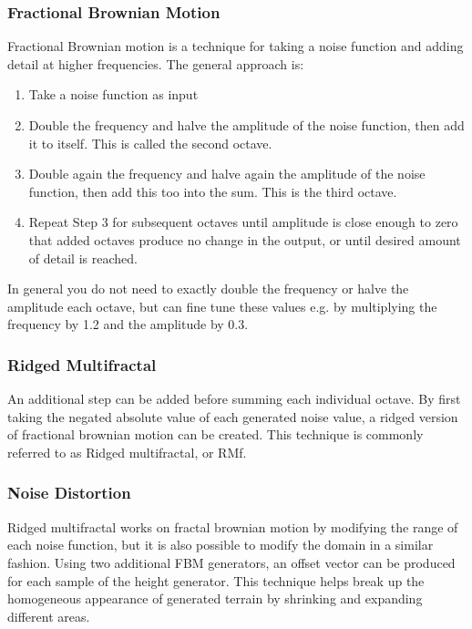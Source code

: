 
\subsubsection{Fractional Brownian Motion}

Fractional Brownian motion is a technique for taking a noise function and adding detail at higher frequencies.
The general approach is:
\begin{enumerate}
\item Take a noise function as input
\item Double the frequency and halve the amplitude of the noise function, then add it to itself. This is called the second octave.
\item Double again the frequency and halve again the amplitude of the noise function, then add this too into the sum. This is the third octave.
\item Repeat Step 3 for subsequent octaves until amplitude is close enough to zero that added octaves produce no change in the output, or until desired amount of detail is reached.
\end{enumerate}

In general you do not need to exactly double the frequency or halve the amplitude each octave, but can fine tune these values e.g. by multiplying the frequency by 1.2 and the amplitude by 0.3.

\subsubsection{Ridged Multifractal}

An additional step can be added before summing each individual octave.
By first taking the negated absolute value of each generated noise value, a ridged version of fractional brownian motion can be created.
This technique is commonly referred to as Ridged multifractal, or RMf.

\subsubsection{Noise Distortion}

Ridged multifractal works on fractal brownian motion by modifying the range of each noise function, but it is also possible to modify the domain in a similar fashion.
Using two additional FBM generators, an offset vector can be produced for each sample of the height generator.
This technique helps break up the homogeneous appearance of generated terrain by shrinking and expanding different areas.


